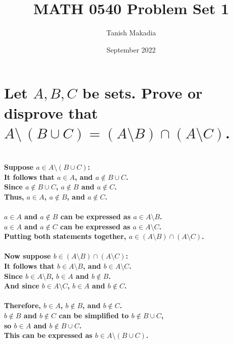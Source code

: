 \documentclass{article}
\title{MATH 0540 Problem Set 1}
\author{Tanish Makadia}
\date{September 2022}
\begin{document}
\maketitle

\section{Let \(A, B, C\) be sets. Prove or disprove that \(A \setminus\,(B \cup C) = (A \setminus B) \cap (A \setminus C)\).}

\paragraph{\large 
\\ Suppose \(a \in A \setminus (B \cup C)\):
\\\indent It follows that \(a \in A\), and \(a \notin B \cup C\).
\\\indent Since \(a \notin B \cup C\), \(a \notin B\) and \(a \notin C\).
\\\indent Thus, \(a \in A\), \(a \notin B\), and \(a \notin C\).}

\paragraph{\large
\(a \in A\) and \(a \notin B\) can be expressed as \(a \in A \setminus B\).
\\ \(a \in A\) and \(a \notin C\) can be expressed as \(a \in A \setminus C\).
\\ Putting both statements together, \(a \in (A \setminus B) \cap (A \setminus C)\).}

\paragraph{\large
Now suppose \(b \in (A \setminus B) \cap (A \setminus C)\):
\\\indent It follows that \(b \in A \setminus B\), and \(b \in A \setminus C\).
\\\indent Since \(b \in A \setminus B\), \(b \in A\) and \(b \notin B\).
\\\indent And since \(b \in A \setminus C\), \(b \in A\) and \(b \notin C\).}

\paragraph{\large
Therefore, \(b\in A\), \(b \notin B\), and \(b \notin C\).
\\\indent \(b \notin B\) and \(b \notin C\) can be simplified to \(b \notin B \cup C\),
\\\indent so \(b \in A\) and \(b \notin B \cup C\).
\\\indent This can be expressed as \(b \in A \setminus (B \cup C)\).
}
\end{document}
